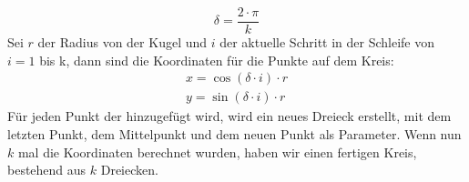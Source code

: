 	\begin{equation}\label{eq:delta}
		\delta =\frac{2 \cdot \pi}{k} 
	\end{equation}
	Sei $r$ der  Radius von der Kugel und $i$ der aktuelle Schritt in der Schleife von $i=1$ bis k, dann sind die Koordinaten für die Punkte auf dem Kreis:
	\begin{equation}\label{eq:circleCoord}
		\begin{aligned}
			x = \cos (\delta \cdot i) \cdot r\\
			y = \sin (\delta \cdot i) \cdot r
		\end{aligned}
	\end{equation}
	Für jeden Punkt der hinzugefügt wird, wird ein neues Dreieck erstellt, mit dem letzten Punkt, dem Mittelpunkt und dem neuen Punkt als Parameter.
	Wenn  nun $k$ mal die Koordinaten berechnet wurden, haben wir einen fertigen Kreis, bestehend aus $k$ Dreiecken.\\
